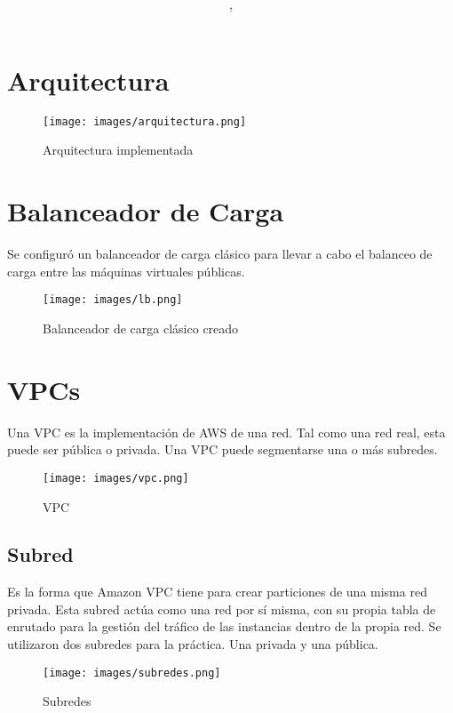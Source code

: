 \documentclass{article}
\author{\nombre , \carnet}
\title{\textbf{\Huge\titulo}}
\begin{document}
\maketitle

\section{ Arquitectura }
\begin{figure}[h] \texttt{[image: images/arquitectura.png]}
                 \caption{Arquitectura implementada}
\end{figure}

\section{Balanceador de Carga}
Se configuró un balanceador de carga clásico para llevar a cabo el balanceo de carga entre las máquinas virtuales públicas.
\begin{figure}[h] \texttt{[image: images/lb.png]}
                 \caption{Balanceador de carga clásico creado}
\end{figure}

\section{VPCs}
Una VPC es la implementación de AWS de una red. Tal como una red real, esta puede ser pública o privada. Una VPC puede segmentarse
una o más subredes.
\begin{figure}[h]
        \texttt{[image: images/vpc.png]}
                 \caption{VPC}
\end{figure}

\subsection{Subred}
Es la forma que Amazon VPC tiene para crear particiones de una misma red privada. Esta subred actúa como una red por sí misma,
con su propia tabla de enrutado para la gestión del tráfico de las instancias dentro de la propia red. Se utilizaron dos subredes para
la práctica. Una privada y una pública.
\begin{figure}[h]
        \texttt{[image: images/subredes.png]}
                 \caption{Subredes}
\end{figure}
\end{document}
